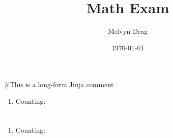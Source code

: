 \documentclass{article}
\title{\textbf{Math Exam}}
\author{
Melvyn Drag
}
\date{\today}
\begin{document}
\maketitle

\section{}
\#{This is a long-form Jinja comment}
\begin{enumerate}[label=(\alph*)]
  \item Counting: 
\end{enumerate}

\section{}
\begin{enumerate}
	  \item Counting: 
\end{enumerate}
\end{document}
